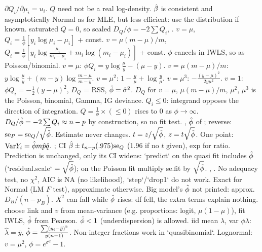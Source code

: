 $\partial Q_i/\partial\mu_i=u_i$. $Q$ need not be a real log-density. $\hat{\beta}$ is consistent and asymptotically Normal as for MLE, but less efficient: use the distribution if known.
\sk{} saturated $Q=0$, so scaled $D_Q/\phi=-2\sum Q_i$, .
\sk{} $v=\mu$, $Q_i=\frac1\phi[y_i\log\mu_i-\mu_i]$ + const.  $v=\mu(m-\mu)/m$, $Q_i=\frac1\phi[y_i\log\frac{\mu_i}{m_i-\mu_i}+m_i\log(m_i-\mu_i)]$ + const. $\phi$ cancels in IWLS, so  as Poisson/binomial.
\sk{} $v=\mu$: $\phi Q_i=y\log\frac\mu y-(\mu-y)$. $v=\mu(m-\mu)/m$: $y\log\frac\mu y+(m-y)\log\frac{m-\mu}{m-y}$. $v=\mu^2$: $1-\frac y\mu+\log\frac y\mu$. $v=\mu^3$: $-\frac{(y-\mu)^2}{2y\mu^2}$.
\sk{} $v=1$: $\phi Q_i=-\frac12(y-\mu)^2$, $D_Q$ = RSS, $\hat{\phi}=\hat\sigma^2$. $D_Q$ for $v=\mu$, $\mu(m-\mu)/m$, $\mu^2$, $\mu^3$ is the Poisson, binomial, Gamma, IG deviance. $Q_i\le0$: integrand opposes the direction of integration.  $Q=\frac1\phi\times(\le0)$ rises to 0 as $\phi\to\infty$.  $D_Q/\hat{\phi}=-2\sum Q_i\approx n-p$ by construction, so no fit test.
\sk{} , $\hat{\phi}$ of ; reverse: $\mathrm{se}_P=\mathrm{se}_Q/\sqrt{\hat{\phi}}$. Estimate never changes. $t=z/\sqrt{\hat{\phi}}$, $z=t\sqrt{\hat{\phi}}$. One point: $\mathrm{Var} Y_i=\hat{\phi} m\hat p\hat q$.
\sk{} ; CI $\hat{\beta}\pm t_{n-p}(.975)\mathrm{se}_Q$ (1.96 if no $t$ given), exp for ratio. Prediction is unchanged, only its CI widens: `predict` on the quasi fit includes $\hat{\phi}$ (`residual.scale` $=\sqrt{\hat{\phi}}$); on the Poisson fit multiply se.fit by $\sqrt{\hat{\phi}}$.
\sk{} , . No adequacy test, no $\chi^2$, AIC is NA (no likelihood), `step`/`drop1` do not work. Exact for Normal (LM $F$ test), approximate otherwise. Big model's $\hat{\phi}$ not printed: approx. $D_B/(n-p_B)$. $X^2$ can fall while $\hat{\phi}$ rises: df fell, the extra terms explain nothing.
\sk{} choose link and $v$ from mean-variance (e.g. proportions: logit, $\mu(1-\mu)$), fit IWLS, $\hat{\phi}$ from Pearson. $\hat{\phi}<1$ (underdispersion) is allowed. iid mean $\lambda$, var $\phi\lambda$: $\hat\lambda=\bar y$, $\hat{\phi}=\frac{\sum(y_i-\bar y)^2}{\bar y(n-1)}$. Non-integer fractions work in `quasibinomial`. Lognormal: $v=\mu^2$, $\phi=e^{\sigma^2}-1$.
